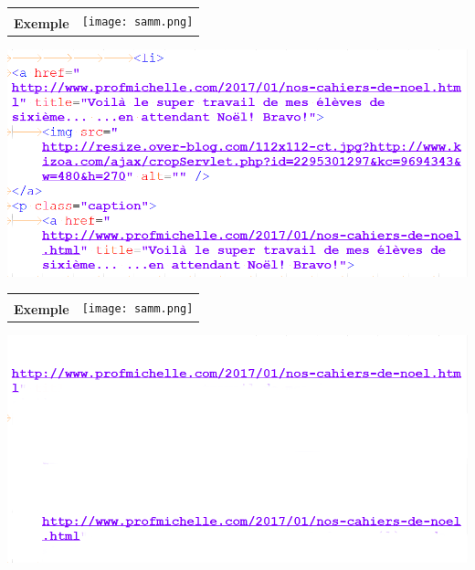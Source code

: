 \documentclass[12pt]{beamer}
\begin{document}
\begin{frame}
\begin{tabular}{b{7cm}l}
& \multirow{2}{*}{\texttt{[image: samm.png]}}\\ {\large \textbf{Exemple}}& 
\end{tabular}

\vspace{0.5cm}

\includegraphics[scale=0.25]{code1-liens.png}

\end{frame}

\begin{frame}
\begin{tabular}{b{7cm}l}
& \multirow{2}{*}{\texttt{[image: samm.png]}}\\ {\large \textbf{Exemple}}& 
\end{tabular}

\vspace{0.5cm}

\includegraphics[scale=0.25]{code1-liens2.png}

\end{frame}
\end{document}

